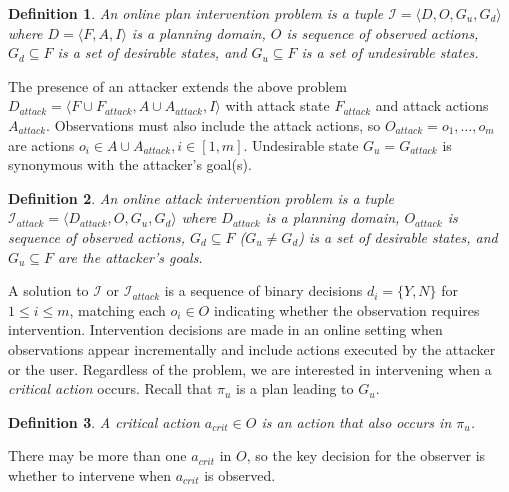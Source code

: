 \documentclass[letterpaper]{article}
\theoremstyle{plain}
\newtheorem{definition}{Definition}
\begin{document}






\theoremstyle{definition}
\begin{definition}
An \textnormal{online plan intervention problem} is a tuple $\mathcal{I} = \langle D, O, G_u, G_d \rangle$ where $D=\langle F, A, I \rangle$ is a planning domain, 
$O$ is  sequence of observed actions,
$G_d \subseteq F$ is a set of desirable states, and
$G_u \subseteq F$ is a set of undesirable states.
\end{definition}

The presence of an attacker extends the above problem $D_{attack}=\langle F \cup F_{attack}, A \cup A_{attack}, I \rangle$ with attack state $F_{attack}$ and attack actions $A_{attack}$.
Observations must also include the attack actions, so 
$O_{attack} = o_1, \ldots , o_m$ are actions $o_i \in A \cup A_{attack}, i \in[1,m]$.
Undesirable state $G_u = G_{attack}$ is synonymous with the attacker's goal(s).
\theoremstyle{definition}
\begin{definition}
An \textnormal{online \emph{attack} intervention problem} is a tuple $\mathcal{I}_{attack} = \langle D_{attack}, O, G_u, G_d \rangle$ where $D_{attack}$ is a planning domain, 
$O_{attack}$ is  sequence of observed actions,
$G_d \subseteq F$ ($G_u \neq G_d$) is a set of desirable states, and
$G_u \subseteq F$ are the attacker's goals.
\end{definition}

A solution to $\mathcal{I}$ or $\mathcal{I}_{attack}$ is a sequence of binary decisions $d_i = \lbrace Y, N \rbrace$ for $1 \leq i \leq m$, matching each $o_i \in O$ indicating whether the observation requires intervention. 
Intervention decisions are made in an online setting when observations appear incrementally and include actions executed by the attacker or the user.
Regardless of the problem, we are interested in intervening when a \emph{critical action} occurs.
Recall that $\pi_u$ is a plan leading to $G_u$.
\begin{definition}
A \textnormal{critical action} $a_{crit} \in O$ is an action that also occurs in $\pi_u$.
\end{definition}
\noindent There may be more than one $a_{crit}$ in $O$, so the key decision for the observer is whether to intervene when $a_{crit}$ is observed.
\end{document}
